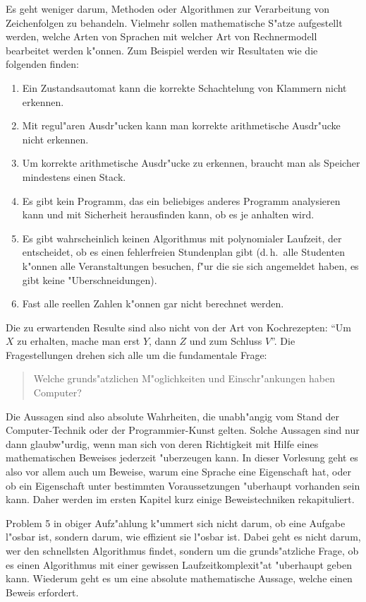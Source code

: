 Es geht weniger darum, Methoden oder Algorithmen zur Verarbeitung
von Zeichenfolgen zu behandeln.
Vielmehr sollen mathematische S"atze aufgestellt werden, welche
Arten von Sprachen mit welcher Art von Rechnermodell bearbeitet
werden k"onnen.
Zum Beispiel werden wir Resultaten wie die folgenden finden:
\begin{enumerate}
\item Ein Zustandsautomat kann die korrekte Schachtelung von
Klammern nicht erkennen.
\item Mit regul"aren Ausdr"ucken kann man korrekte arithmetische
Ausdr"ucke nicht erkennen.
\item Um korrekte arithmetische Ausdr"ucke zu erkennen, braucht man als
Speicher mindestens einen Stack.
\item Es gibt kein Programm, das ein beliebiges anderes Programm
analysieren kann und mit Sicherheit herausfinden kann, ob es je anhalten
wird.
\item Es gibt wahrscheinlich keinen Algorithmus mit polynomialer Laufzeit,
der entscheidet, ob es einen fehlerfreien Stundenplan gibt (d.\,h.~alle 
Studenten k"onnen alle Veranstaltungen besuchen, f"ur die sie sich
angemeldet haben, es gibt keine "Uberschneidungen).
\item Fast alle reellen Zahlen k"onnen gar nicht berechnet werden.
\end{enumerate}
Die zu erwartenden Resulte sind also nicht von der Art von Kochrezepten:
``Um $X$ zu erhalten, mache man erst $Y$, dann $Z$ und zum Schluss $V$''.
Die Fragestellungen drehen sich alle um die fundamentale Frage:
\begin{quote}
Welche grunds"atzlichen M"oglichkeiten und Einschr"ankungen haben
Computer?
\end{quote}
Die Aussagen sind also absolute Wahrheiten, die unabh"angig vom Stand
der Com\-pu\-ter-Technik oder der Programmier-Kunst gelten.
Solche Aussagen sind nur dann glaub\-w"urdig, wenn man sich von deren
Richtigkeit mit Hilfe eines mathematischen Beweises jederzeit "uberzeugen
kann. In dieser Vorlesung geht es also vor allem auch um Beweise, 
warum eine Sprache eine Eigenschaft hat, oder ob ein Eigenschaft
unter bestimmten Voraussetzungen "uberhaupt vorhanden sein kann.
Daher werden im ersten Kapitel kurz einige Beweistechniken rekapituliert.

Problem 5 in obiger Aufz"ahlung k"ummert sich nicht darum, ob eine
Aufgabe l"osbar ist, sondern darum, wie effizient sie l"osbar ist.
Dabei geht es nicht darum, wer den schnellsten Algorithmus findet,
sondern um die grunds"atzliche Frage, ob es einen Algorithmus mit
einer gewissen Laufzeitkomplexit"at "uberhaupt geben kann.
Wiederum geht es um eine absolute mathematische Aussage, welche
einen Beweis erfordert. 

